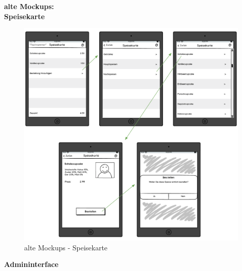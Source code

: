 \textbf{alte Mockups:}\\
\textbf{Speisekarte}\\
			\begin{figure}[H]
			\begin{centering}
			\includegraphics[width = 1\textwidth]{Bilder/Jok_alte_mockups}
			\par\end{centering}
			\caption{alte Mockups - Speisekarte}
			\label{alte Mockups - Speisekarte}
			\end{figure}
\pagebreak
\textbf{Admininterface}\\
